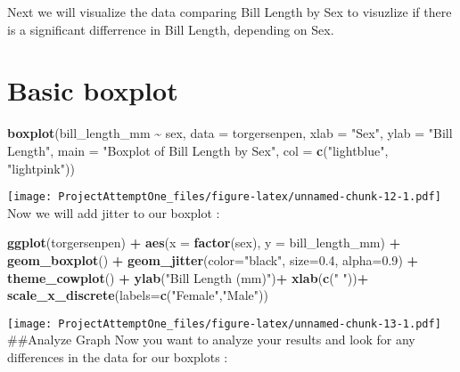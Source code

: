 \documentclass[
]{article}
\newenvironment{Shaded}{\begin{snugshade}}{\end{snugshade}}
\newcommand{\AttributeTok}[1]{\textcolor[rgb]{0.13,0.29,0.53}{#1}}
\newcommand{\FloatTok}[1]{\textcolor[rgb]{0.00,0.00,0.81}{#1}}
\newcommand{\FunctionTok}[1]{\textcolor[rgb]{0.13,0.29,0.53}{\textbf{#1}}}
\newcommand{\NormalTok}[1]{#1}
\newcommand{\SpecialCharTok}[1]{\textcolor[rgb]{0.81,0.36,0.00}{\textbf{#1}}}
\newcommand{\StringTok}[1]{\textcolor[rgb]{0.31,0.60,0.02}{#1}}
\begin{document}
Next we will visualize the data comparing Bill Length by Sex to
visuzlize if there is a significant differrence in Bill Length,
depending on Sex.

\section{Basic boxplot}\label{basic-boxplot}

\begin{Shaded}
\begin{Highlighting}[]
\FunctionTok{boxplot}\NormalTok{(bill\_length\_mm }\SpecialCharTok{\textasciitilde{}}\NormalTok{ sex, }\AttributeTok{data =}\NormalTok{ torgersenpen,}
        \AttributeTok{xlab =} \StringTok{"Sex"}\NormalTok{,}
        \AttributeTok{ylab =} \StringTok{"Bill Length"}\NormalTok{,}
        \AttributeTok{main =} \StringTok{"Boxplot of Bill Length by Sex"}\NormalTok{,}
        \AttributeTok{col =} \FunctionTok{c}\NormalTok{(}\StringTok{"lightblue"}\NormalTok{, }\StringTok{"lightpink"}\NormalTok{))}
\end{Highlighting}
\end{Shaded}

\texttt{[image: ProjectAttemptOne\_files/figure-latex/unnamed-chunk-12-1.pdf]}
Now we will add jitter to our boxplot :

\begin{Shaded}
\begin{Highlighting}[]
\FunctionTok{ggplot}\NormalTok{(torgersenpen) }\SpecialCharTok{+}
  \FunctionTok{aes}\NormalTok{(}\AttributeTok{x =} \FunctionTok{factor}\NormalTok{(sex), }\AttributeTok{y =}\NormalTok{ bill\_length\_mm) }\SpecialCharTok{+}
  \FunctionTok{geom\_boxplot}\NormalTok{() }\SpecialCharTok{+}
  \FunctionTok{geom\_jitter}\NormalTok{(}\AttributeTok{color=}\StringTok{"black"}\NormalTok{, }\AttributeTok{size=}\FloatTok{0.4}\NormalTok{, }\AttributeTok{alpha=}\FloatTok{0.9}\NormalTok{) }\SpecialCharTok{+}
  \FunctionTok{theme\_cowplot}\NormalTok{() }\SpecialCharTok{+}
  \FunctionTok{ylab}\NormalTok{(}\StringTok{"Bill Length (mm)"}\NormalTok{)}\SpecialCharTok{+}
  \FunctionTok{xlab}\NormalTok{(}\FunctionTok{c}\NormalTok{(}\StringTok{" "}\NormalTok{))}\SpecialCharTok{+}
  \FunctionTok{scale\_x\_discrete}\NormalTok{(}\AttributeTok{labels=}\FunctionTok{c}\NormalTok{(}\StringTok{"Female"}\NormalTok{,}\StringTok{"Male"}\NormalTok{))}
\end{Highlighting}
\end{Shaded}

\texttt{[image: ProjectAttemptOne\_files/figure-latex/unnamed-chunk-13-1.pdf]}
\#\#Analyze Graph Now you want to analyze your results and look for any
differences in the data for our boxplots :
\end{document}
